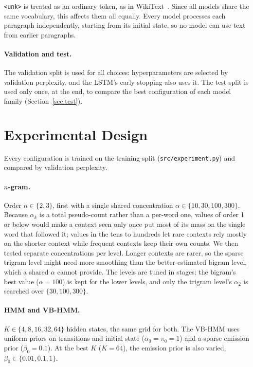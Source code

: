 \documentclass[11pt]{article}
\begin{document}
\texttt{<unk>} is treated as an ordinary token, as in
WikiText~\cite{merity2016}. Since all models share the same vocabulary,
this affects them all equally. Every model processes each paragraph
independently, starting from its initial state, so no model can use text
from earlier paragraphs.

\paragraph{Validation and test.} The validation split is used for all
choices: hyperparameters are selected by validation perplexity, and the
LSTM's early stopping also uses it. The test split is used only once, at
the end, to compare the best configuration of each model family
(Section~\ref{sec:test}).





\section{Experimental Design}
\label{sec:design}

Every configuration is trained on the training split
(\texttt{src/experiment.py}) and compared by validation perplexity.

\paragraph{$n$-gram.} Order $n \in \{2, 3\}$, first with a single shared
concentration $\alpha \in \{10, 30, 100, 300\}$. Because $\alpha_k$ is a
total pseudo-count rather than a per-word one, values of order 1 or below
would make a context seen only once put most of its mass on the single
word that followed it; values in the tens to hundreds let rare contexts
rely mostly on the shorter context while frequent contexts keep their
own counts. We then tested separate concentrations per level. Longer
contexts are rarer, so the sparse trigram level might need more smoothing
than the better-estimated bigram level, which a shared $\alpha$ cannot
provide. The levels are tuned in stages: the bigram's best value
($\alpha = 100$) is kept for the lower levels, and only the trigram
level's $\alpha_2$ is searched over $\{30, 100, 300\}$.

\paragraph{HMM and VB-HMM.} $K \in \{4, 8, 16, 32, 64\}$ hidden states,
the same grid for both. The VB-HMM uses uniform priors on transitions and
initial state ($\alpha_0 = \pi_0 = 1$) and a sparse emission prior
($\beta_0 = 0.1$). At the best $K$ ($K = 64$), the emission prior is
also varied, $\beta_0 \in \{0.01, 0.1, 1\}$.
\end{document}
